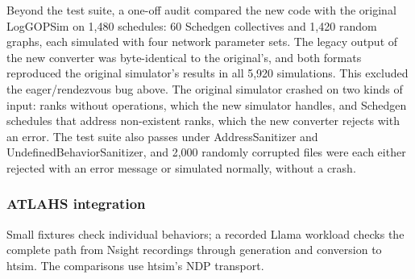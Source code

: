 \documentclass[10pt,a4paper]{article}
\begin{document}
Beyond the test suite, a one-off audit compared the new code with the original LogGOPSim on 1,480 schedules: 60 Schedgen collectives and 1,420 random graphs, each simulated with four network parameter sets. The legacy output of the new converter was byte-identical to the original's, and both formats reproduced the original simulator's results in all 5,920 simulations. This excluded the eager/rendezvous bug above. The original simulator crashed on two kinds of input: ranks without operations, which the new simulator handles, and Schedgen schedules that address non-existent ranks, which the new converter rejects with an error. The test suite also passes under AddressSanitizer and UndefinedBehaviorSanitizer, and 2,000 randomly corrupted files were each either rejected with an error message or simulated normally, without a crash.

\hypertarget{atlahs-integration}{}
\subsubsection{ATLAHS integration}

Small fixtures check individual behaviors; a recorded Llama workload checks the complete path from Nsight recordings through generation and conversion to htsim. The comparisons use htsim's NDP transport.
\end{document}
